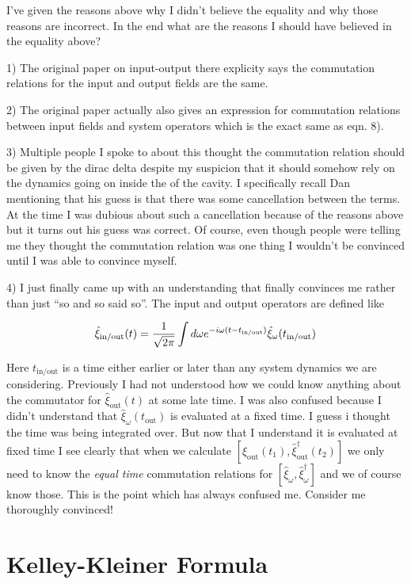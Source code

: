 \documentclass[12pt]{article}
\begin{document}
I've given the reasons above why I didn't believe the equality and why those reasons are incorrect. In the end what are the reasons I should have believed in the equality above?

1)  The original paper on input-output there explicity says the commutation relations for the input and output fields are the same.

2) The original paper actually also gives an expression for commutation relations between input fields and system operators which is the exact same as eqn. 8). 

3) Multiple people I spoke to about this thought the commutation relation should be given by the dirac delta despite my suspicion that it should somehow rely on the dynamics going on inside the of the cavity. I specifically recall Dan mentioning that his guess is that there was some cancellation between the terms. At the time I was dubious about such a cancellation because of the reasons above but it turns out his guess was correct. Of course, even though people were telling me they thought the commutation relation was one thing I wouldn't be convinced until I was able to convince myself.

4) I just finally came up with an understanding that finally convinces me rather than just ``so and so said so''. The input and output operators are defined like

\begin{align}
\hat{\xi}_{\text{\text{in/out}}}(t) = \frac{1}{\sqrt{2\pi}} \int d\omega e^{-i\omega (t-t_{\text{in/out}})} \hat{\xi}_{\omega}(t_{\text{in/out}})
\end{align}

Here $t_{\text{in/out}}$ is a time either earlier or later than any system dynamics we are considering. Previously I had not understood how we could know anything about the commutator for $\hat{\xi}_{\text{out}}(t)$ at some late time. I was also confused because I didn't understand that $\hat{\xi}_{\omega}(t_{\text{out}})$ is evaluated at a fixed time. I guess i thought the time was being integrated over. But now that I understand it is evaluated at fixed time I see clearly that when we calculate $[\hat{\xi}_{\text{out}}(t_1),\hat{\xi}_{\text{out}}^{\dag}(t_2)]$ we only need to know the \textit{equal time} commutation relations for $[\hat{\xi}_{\omega},\hat{\xi}_{\omega}^{\dag}]$ and we of course know those. This is the point which has always confused me. Consider me thoroughly convinced!


\section{Kelley-Kleiner Formula}
\end{document}
